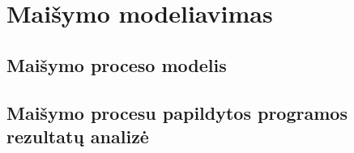 
\section{Maišymo modeliavimas}
\subsection{Maišymo proceso modelis}
\subsection{Maišymo procesu papildytos programos rezultatų analizė}

